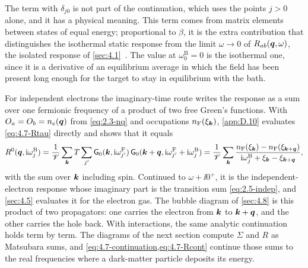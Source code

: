 The term with $\delta_{j0}$ is not part of the continuation, which uses the points $j > 0$ alone, and it has a physical meaning. This term comes from matrix elements between states of equal energy; proportional to $\beta$, it is the extra contribution that distinguishes the isothermal static response from the limit $\omega \to 0$ of $R_{ab}(\bm{q},\omega)$, the isolated response of \cref{sec:4.1}~\cite{kubo1957statistical}. The value at $\omega^{\mathrm{B}}_0 = 0$ is the isothermal one, since it is a derivative of an equilibrium average in which the field has been present long enough for the target to stay in equilibrium with the bath.

For independent electrons the imaginary-time route writes the response as a sum over one fermionic frequency of a product of two free Green's functions. With $O_a = O_b = n_e(\bm{q})$ from \cref{eq:2.3-nq} and occupations $n_{\mathrm{F}}(\xi_{\bm{k}})$, \cref{app:D.10} evaluates \cref{eq:4.7-Rtau} directly and shows that it equals
\begin{equation}
  R^0(\bm{q},\mathrm{i}\omega^{\mathrm{B}}_j) = \frac{1}{\mathscr{V}}\sum_{\bm{k}}T\sum_{j'}\mathsf{G}_0(\bm{k},\mathrm{i}\omega^{\mathrm{F}}_{j'})\,\mathsf{G}_0(\bm{k} + \bm{q},\mathrm{i}\omega^{\mathrm{F}}_{j'} + \mathrm{i}\omega^{\mathrm{B}}_j)
  = \frac{1}{\mathscr{V}}\sum_{\bm{k}}\frac{n_{\mathrm{F}}(\xi_{\bm{k}}) - n_{\mathrm{F}}(\xi_{\bm{k}+\bm{q}})}{\mathrm{i}\omega^{\mathrm{B}}_j + \xi_{\bm{k}} - \xi_{\bm{k}+\bm{q}}} ,
  \label{eq:4.7-bubble}
\end{equation}
with the sum over $\bm{k}$ including spin. Continued to $\omega + \ii0^+$, it is the independent-electron response whose imaginary part is the transition sum \cref{eq:2.5-indep}, and \cref{sec:4.5} evaluates it for the electron gas. The bubble diagram of \cref{sec:4.8} is this product of two propagators: one carries the electron from $\bm{k}$ to $\bm{k} + \bm{q}$, and the other carries the hole back. With interactions, the same analytic continuation holds term by term. The diagrams of the next section compute $\Sigma$ and $R$ as Matsubara sums, and \cref{eq:4.7-continuation,eq:4.7-Rcont} continue those sums to the real frequencies where a dark-matter particle deposits its energy.
